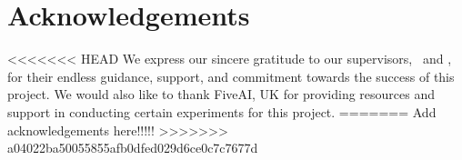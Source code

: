 \chapter*{Acknowledgements}

\vspace{10mm}
<<<<<<< HEAD
We express our sincere gratitude to our supervisors, \supervisorA \ and \supervisorB, for their endless guidance, support, and commitment towards the success of this project. We would also like to thank FiveAI, UK for providing resources and support in conducting certain experiments for this project. 
=======
Add acknowledgements here!!!!!
>>>>>>> a04022ba50055855afb0dfed029d6ce0c7c7677d

